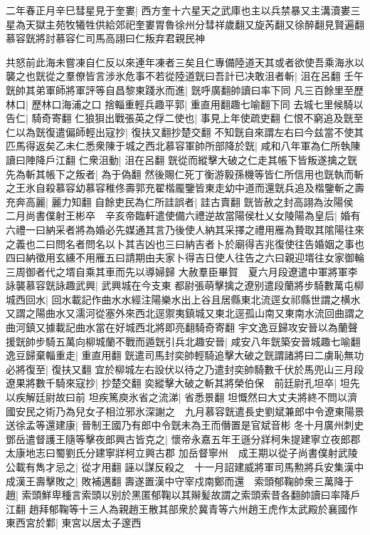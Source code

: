 二年春正月辛巳彗星見于奎婁|{
	西方奎十六星天之武庫也主以兵禁暴又主溝瀆婁三星為天獄主苑牧犧牲供給郊祀奎婁胃魯徐州分彗祥歲翻又旋芮翻又徐醉翻見賢遍翻}
慕容皝將討慕容仁司馬高詡曰仁叛弃君親民神

共怒前此海未嘗凍自仁反以來連年凍者三矣且仁專備陸道天其或者欲使吾乘海氷以襲之也皝從之羣僚皆言涉氷危事不若從陸道皝曰吾計已决敢沮者斬|{
	沮在呂翻}
壬午皝帥其弟軍師將軍評等自昌黎東踐氷而進|{
	皝呼廣翻帥讀曰率下同}
凡三百餘里至歷林口|{
	歷林口海浦之口}
捨輜重輕兵趣平郭|{
	重直用翻趣七喻翻下同}
去城七里候騎以告仁|{
	騎奇寄翻}
仁狼狽出戰張英之俘二使也|{
	事見上年使疏吏翻}
仁恨不窮追及皝至仁以為皝復遣偏師輕出寇抄|{
	復扶又翻抄楚交翻}
不知皝自來謂左右曰今兹當不使其匹馬得返矣乙未仁悉衆陳于城之西北慕容軍帥所部降於皝|{
	咸和八年軍為仁所執陳讀曰陣降戶江翻}
仁衆沮動|{
	沮在呂翻}
皝從而縱擊大破之仁走其帳下皆叛遂擒之皝先為斬其帳下之叛者|{
	為于偽翻}
然後賜仁死丁衡游毅孫機等皆仁所信用也皝執而斬之王氷自殺慕容幼慕容稚佟壽郭充翟楷龎鑒皆東走幼中道而還皝兵追及楷鑒斬之壽充奔高麗|{
	麗力知翻}
自餘吏民為仁所詿誤者|{
	詿古賣翻}
皝皆赦之封高詡為汝陽侯　二月尚書僕射王彬卒　辛亥帝臨軒遣使備六禮逆故當陽侯杜乂女陵陽為皇后|{
	婚有六禮一曰納采者將為婚必先媒通其言乃後使人納其采擇之禮用雁為贄取其隂陽往來之義也二曰問名者問名以卜其吉凶也三曰納吉者卜於廟得吉兆復使往告婚姻之事也四曰納徵用玄纁不用雁五曰請期由夫家卜得吉日使人往告之六曰親迎壻往女家御輪三周御者代之壻自乘其車而先以導婦歸}
大赦羣臣畢賀　夏六月段遼遣中軍將軍李詠襲慕容皝詠趣武興|{
	武興城在今支東}
都尉張萌擊擒之遼别遣段蘭將步騎數萬屯柳城西回水|{
	回水載記作曲水水經注陽樂水出上谷且居縣東北流逕女祁縣世謂之横水又謂之陽曲水又濡河從塞外來西北逕禦夷鎮城又東北逕孤山南又東南水流回曲謂之曲河鎮又據載記曲水當在好城西北將即亮翻騎奇寄翻}
宇文逸豆歸攻安晉以為蘭聲援皝帥步騎五萬向柳城蘭不戰而遁皝引兵北趣安晉|{
	咸安八年皝築安晉城趣七喻翻}
逸豆歸棄輜重走|{
	重直用翻}
皝遣司馬封奕帥輕騎追擊大破之皝謂諸將曰二虜恥無功必將復至|{
	復扶又翻}
宜於柳城左右設伏以待之乃遣封奕帥騎數千伏於馬兜山三月段遼果將數千騎來寇抄|{
	抄楚交翻}
奕縱擊大破之斬其將榮伯保　前廷尉孔坦卒|{
	坦先以疾解廷尉故曰前}
坦疾篤庾氷省之流涕|{
	省悉景翻}
坦慨然曰大丈夫將終不問以濟國安民之術乃為兒女子相泣邪氷深謝之　九月慕容皝遣長史劉斌兼郎中令遼東陽景送徐孟等還建康|{
	晉制王國乃有郎中令皝未為王而僭置是官斌音彬}
冬十月廣州刺史鄧岳遣督護王隨等擊夜郎興古皆克之|{
	懷帝永嘉五年王遜分牂柯朱提建寧立夜郎郡太康地志曰蜀劉氏分建寧牂柯立興古郡}
加岳督寧州　成王期以從子尚書僕射武陵公載有雋才忌之|{
	從才用翻}
誣以謀反殺之　十一月詔建威將軍司馬勲將兵安集漢中成漢王壽擊敗之|{
	敗補邁翻}
壽遂置漢中守宰戍南鄭而還　索頭郁鞠帥衆三萬降于趙|{
	索頭鮮卑種言索頭以别於黑匿郁鞠以其辮髪故謂之索頭索昔各翻帥讀曰率降戶江翻}
趙拜郁鞠等十三人為親趙王散其部衆於冀青等六州趙王虎作太武殿於襄國作東西宮於鄴|{
	東宮以居太子邃西}


